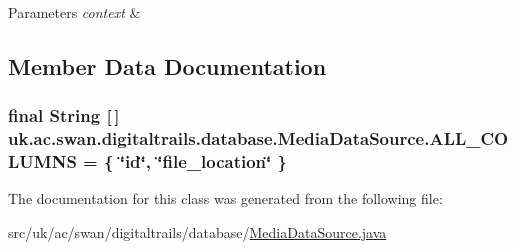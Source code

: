 \begin{DoxyParams}{Parameters}
{\em context} & \\
\hline
\end{DoxyParams}


\subsection{Member Data Documentation}
\hypertarget{classuk_1_1ac_1_1swan_1_1digitaltrails_1_1database_1_1_media_data_source_a1da52fc2b3e0eafb762c0f18a04c82e8}{
\subsubsection[{A\+L\+L\+\_\+\+C\+O\+L\+U\+M\+N\+S}]{\setlength{\rightskip}{0pt plus 5cm}final String \mbox{[}$\,$\mbox{]} uk.\+ac.\+swan.\+digitaltrails.\+database.\+Media\+Data\+Source.\+A\+L\+L\+\_\+\+C\+O\+L\+U\+M\+N\+S = \{ \char`\"{}id\char`\"{}, \char`\"{}file\+\_\+location\char`\"{} \}\hspace{0.3cm}{\ttfamily [protected]}}}\label{classuk_1_1ac_1_1swan_1_1digitaltrails_1_1database_1_1_media_data_source_a1da52fc2b3e0eafb762c0f18a04c82e8}


The documentation for this class was generated from the following file\+:\begin{DoxyCompactItemize}
\item 
src/uk/ac/swan/digitaltrails/database/\hyperlink{_media_data_source_8java}{Media\+Data\+Source.\+java}\end{DoxyCompactItemize}
